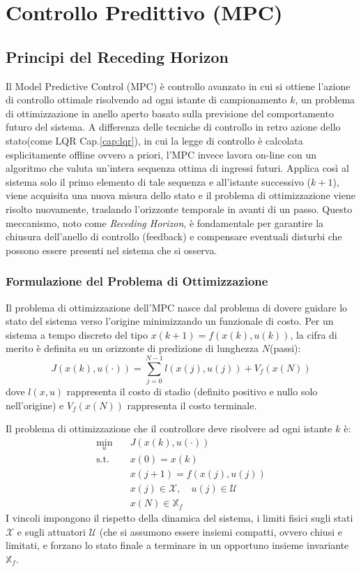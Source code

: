 \chapter{Controllo Predittivo (MPC)}
\label{cap:mpc}

\section{Principi del Receding Horizon}
Il Model Predictive Control (MPC) è  controllo avanzato in cui si ottiene  l'azione di controllo ottimale  risolvendo ad ogni istante di campionamento $k$, un problema di ottimizzazione in anello aperto basato sulla previsione del comportamento futuro del sistema. A differenza delle tecniche di controllo in retro azione dello stato(come LQR Cap.\ref{cap:lqr}), in cui la legge di controllo è calcolata esplicitamente offline ovvero a priori, l'MPC invece lavora on-line con un algoritmo che valuta un'intera sequenza ottima di ingressi futuri. Applica così al sistema solo il primo elemento di tale sequenza e all'istante successivo ($k+1$), viene acquisita una nuova misura dello stato e il problema di ottimizzazione viene risolto nuovamente, traslando l'orizzonte temporale in avanti di un passo. Questo meccanismo, noto come \textit{Receding Horizon}, è fondamentale per garantire la chiusura dell'anello di controllo (feedback) e compensare eventuali disturbi che possono essere presenti nel sistema che si osserva.

\subsection{Formulazione del Problema di Ottimizzazione}
Il problema di ottimizzazione dell'MPC nasce dal problema di dovere guidare lo stato del sistema verso l'origine minimizzando un funzionale di costo. Per un sistema a tempo discreto del tipo $x(k+1) = f(x(k), u(k))$, la cifra di merito è definita su un orizzonte di predizione di lunghezza $N$(passi):
\begin{equation}
	J(x(k), u(\cdot)) = \sum_{j=0}^{N-1} l(x(j), u(j)) + V_f(x(N))
\end{equation}
dove $l(x,u)$ rappresenta il costo di stadio (definito positivo e nullo solo nell'origine) e $V_f(x(N))$ rappresenta il costo terminale. 

Il problema di ottimizzazione che il controllore deve risolvere ad ogni istante $k$ è:
\begin{align}
	\min_{u} \quad & J(x(k), u(\cdot)) \label{eq:mpc_cost}\\
	\text{s.t.} \quad & x(0) = x(k) \nonumber \\
	& x(j+1) = f(x(j), u(j)) \nonumber \\
	& x(j) \in \mathcal{X}, \quad u(j) \in \mathcal{U} \nonumber \\
	& x(N) \in \mathbb{X}_f \nonumber 
\end{align}
I vincoli impongono il rispetto della dinamica del sistema, i limiti fisici sugli stati $\mathcal{X}$ e sugli attuatori $\mathcal{U}$ (che si assumono essere insiemi compatti, ovvero chiusi e limitati, e forzano lo stato finale a terminare in un opportuno insieme invariante $\mathbb{X}_f$.

